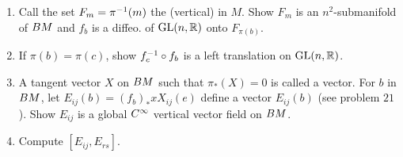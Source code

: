\documentclass[../main]{subfiles}
\begin{document}
\begin{enumerate}
\begin{enumerate}[label=(\roman{enumii})]
    \item Call the set $F_m = \pi^{-1}(m)$ the (vertical)  in $M$. Show $F_m$ is an $n^2$-submanifold of $BM$ and $f_b$ is a diffeo. of $\mathrm{GL}(n, \mathbb{R})$ onto $F_{\pi(b)}$. 
    \item If $\pi(b) = \pi(c)$, show $f_c ^{-1} \circ f_b$ is a left translation on $\mathrm{GL}(n,\mathbb{R})$.
    \item A tangent vector $X$ on $BM$ such that $\pi_*(X) = 0$ is called a  vector. For $b$ in $BM$, let $E_{i  j} (b) = (f_b)_* xX_{i  j}(e)$ define a vector $E_{i  j} (b)$ (see problem $21$). Show $E_{i  j}$ is a global $C^\infty$ vertical vector field on $BM$.
    \item Compute $[E_{i  j}, E_{r  s}]$.
\end{enumerate}

\end{enumerate}
\end{document}
